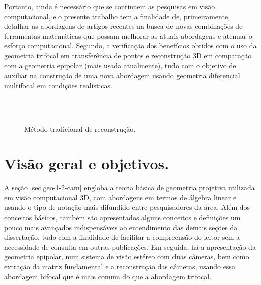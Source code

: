 Portanto, ainda é necessário que se continuem as pesquisas em visão computacional, e o presente trabalho tem a finalidade de, primeiramente, detalhar as abordagens de artigos recentes na busca de novas combinações de ferramentas matemáticas que possam melhorar as atuais abordagens e atenuar o esforço computacional. Segundo, a verificação dos benefícios obtidos com o uso da geometria trifocal em transferência de pontos e reconstrução 3D em comparação com a geometria epipolar (mais usada atualmente), tudo com o objetivo de auxiliar na construção de uma nova abordagem usando geometria diferencial multifocal em condições realísticas.
\begin{figure}[!htb]{\textwidth}
\caption{M\'etodo tradicional de reconstru\c c\~ao.}
\hfill
{}\hfill
\\
\hfill
{}\hfill
\\
\hfill
{}\hfill
{}
\label{fig.medusa}
\end{figure}

\section*{Visão geral e objetivos.}

A seção \ref{sec.geo-1-2-cam} engloba a teoria básica de geometria projetiva utilizada em visão computacional 3D, com abordagens em termos de álgebra linear e usando o tipo de notação mais difundido entre pesquisadores da área. Além dos conceitos básicos, também são apresentados alguns conceitos e definições um pouco mais avançados indispensáveis ao entendimento das demais seções da dissertação, tudo com a finalidade de facilitar a compreensão do leitor sem a necessidade de consulta em outras publicações. Em seguida, há a apresentação da geometria epipolar, num sistema de visão estéreo com duas câmeras, bem como extração da matriz fundamental e a reconstrução das câmeras, usando essa abordagem bifocal que é mais comum do que a abordagem trifocal.

